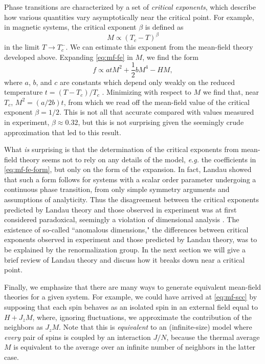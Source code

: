 Phase transitions are characterized by a set of \emph{critical exponents},
which describe how various quantities vary asymptotically near the critical
point. For example, in magnetic systems, the critical exponent $\beta$
is defined as
\begin{equation}
  M \propto (T_c - T)^{\beta}
\end{equation}
in the limit $T \to T_c^-$.
We can estimate this exponent from the mean-field theory developed above.
Expanding \cref{eq:mf-fe} in $M$, we find the form
\begin{equation}
  f \propto a t M^2 + \frac{1}{2} b M^4 - H M,
  \label{eq:mf-fe-form}
\end{equation}
where $a$, $b$, and $c$ are constants which depend only weakly on the reduced
temperature $t=(T-T_c)/T_c$ \autocite{cardy1996scaling}. Minimizing with
respect to $M$ we find that, near $T_c$, $M^2=(a/2b)t$, from which we read off
the mean-field value of the critical exponent $\beta=1/2$. This is not all that
accurate compared with values measured in experiment, $\beta \approx 0.32$, but
this is not surprising given the seemingly crude approximation that led to this
result.

What \emph{is} surprising is that the determination of the critical exponents
from mean-field theory seems not to rely on any details of the model,
\textit{e.g.} the coefficients in \cref{eq:mf-fe-form}, but only on the form of
the expansion. In fact, Landau showed that such a form follows for systems with
a scalar order parameter undergoing a continuous phase transition, from only
simple symmetry arguments and assumptions of analyticity. Thus the disagreement
between the critical exponents predicted by Landau theory and those observed in
experiment was at first considered paradoxical, seemingly a violation of
dimensional analysis \autocite{goldenfeld1992lectures}. The existence of
so-called ``anomalous dimensions," the differences between critical exponents
observed in experiment and those predicted by Landau theory, was to be
explained by the renormalization group. In the next section we will give a
brief review of Landau theory and discuss how it breaks down near a critical
point.

Finally, we emphasize that there are many ways to generate equivalent
mean-field theories for a given system. For example, we could have arrived at
\cref{eq:mf-scc} by supposing that each spin behaves as an isolated spin in an
external field equal to $H + J_z M$, where, ignoring fluctuations, we
approximate the contribution of the neighbors as $J_z M$. Note that this is
\emph{equivalent} to an (infinite-size) model where \emph{every} pair of spins
is coupled by an interaction $J/N$, because the thermal average $M$ is
equivalent to the average over an infinite number of neighbors in the latter
case.

